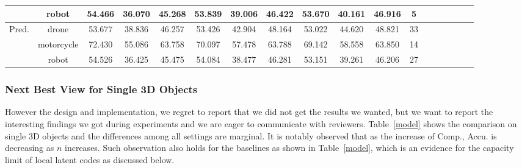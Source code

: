 \begin{table*}[htb]
\begin{tabular}{|c|c|c|c|c|c|c|c|c|c|c|c|c|c|c|c|c|c|}
            & robot &54.466& 36.070& 45.268
            & 53.839& 39.006& 46.422
                &53.670& 40.161& 46.916 & 5\\                      \hline
        \multirow{3}{*}{Pred.} & drone &53.677& 38.836& 46.257
            & 53.426& 42.904& 48.164
                & 53.022& 44.620& 48.821 & 33\\    \cline{2-12}
            & motorcycle & 72.430& 55.086& 63.758
            & 70.097& 57.478& 63.788
                & 69.142& 58.558& 63.850 & 14\\                 \cline{2-12}
            & robot & 54.526& 36.425& 45.475
            & 54.084& 38.477& 46.281
                &53.151& 39.261& 46.206 & 27\\                      \hline
    \end{tabular}
\end{table*}
\subsubsection{Next Best View for Single 3D Objects}
However the design and implementation, we regret to report that we did not get the results we wanted, but we want to report the interesting findings we got during experiments and we are eager to communicate with reviewers.
Table~\ref{model} shows the comparison on single 3D objects and the differences among all settings are marginal.
It is notably observed that as the increase of Comp., Accu. is decreasing as $n$ increases.
Such observation also holds for the baselines as shown in Table~\ref{model}, which is an evidence for the capacity limit of local latent codes as discussed below.

